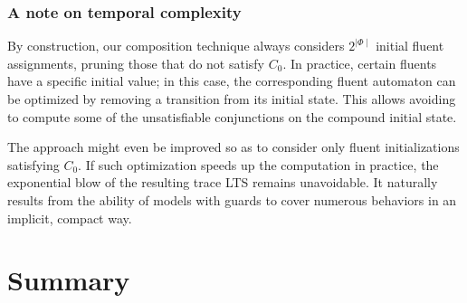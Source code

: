 \subsubsection*{A note on temporal complexity}

By construction, our composition technique always considers $2^{\mid\Phi\mid}$ initial fluent assignments, pruning those that do not satisfy $C_0$. In practice, certain fluents have a specific initial value; in this case, the corresponding fluent automaton can be optimized by removing a transition from its initial state. This allows avoiding to compute some of the unsatisfiable conjunctions on the compound initial state. 

The approach might even be improved so as to consider only fluent initializations satisfying $C_0$. If such optimization speeds up the computation in practice, the exponential blow of the resulting trace LTS remains unavoidable. It naturally results from the ability of models with guards to cover numerous behaviors in an implicit, compact way.

\section{Summary}

